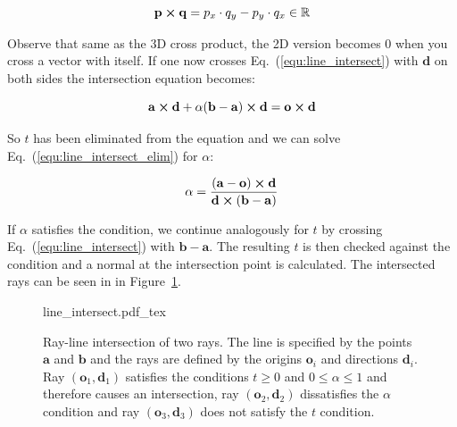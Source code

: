 \documentclass[a4paper,10pt]{article}
\renewcommand{\vec}[1]{\mathbf{#1}}
\newcommand{\equref}[1]{Eq.~(\ref{#1})}
\newcommand{\figref}[1]{Figure~\ref{#1}}
\begin{document}
    \begin{equation}
        \label{equ:2d_cross}
        \vec{p} \cross \vec{q} = 
        p_x \cdot q_y - p_y \cdot q_x \in \mathbb{R}
    \end{equation}

    Observe that same as the 3D cross product, the 2D version becomes 0
    when you cross a vector with itself.
    If one now crosses \equref{equ:line_intersect} with $\vec{d}$ on
    both sides the intersection equation becomes:
    
    \begin{equation}
        \label{equ:line_intersect_elim}
        \vec{a} \cross \vec{d} + \alpha (\vec{b} - \vec{a}) \cross \vec{d} =
        \vec{o} \cross \vec{d}
    \end{equation}

    So $t$ has been eliminated from the equation and we can solve 
    \equref{equ:line_intersect_elim} for $\alpha$:

    \begin{equation}
        \label{equ:line_intersect_alpha}
        \alpha = \frac{(\vec{a} - \vec{o}) \cross \vec{d}}
                      {\vec{d} \cross (\vec{b} - \vec{a})}
    \end{equation}

    If $\alpha$ satisfies the condition, we continue analogously for
    $t$ by crossing \equref{equ:line_intersect} with $\vec{b} - \vec{a}$.
    The resulting $t$ is then checked against the condition and
    a normal at the intersection point is calculated.
    The intersected rays can be seen in in \figref{fig:line_intersect}.

    \begin{center}
        \begin{figure}
            \centering    
            \def\svgwidth{0.8\textwidth}
            {line_intersect.pdf_tex}
            \caption{
                Ray-line intersection of two rays. The line is specified by
                the points $\vec{a}$ and $\vec{b}$ and the rays are 
                defined by
                the origins $\vec{o}_i$ and directions $\vec{d}_i$.
                Ray $(\vec{o}_1, \vec{d}_1)$ satisfies the conditions 
                $t \geq 0$ and $0 \leq \alpha \leq 1$
                and therefore causes an intersection, ray $(\vec{o}_2, \vec{d}_2)$
                dissatisfies the $\alpha$ condition and ray $(\vec{o}_3, \vec{d}_3)$
                does not satisfy the $t$ condition. 
            }
            \label{fig:line_intersect}
        \end{figure}
    \end{center}
\end{document}
